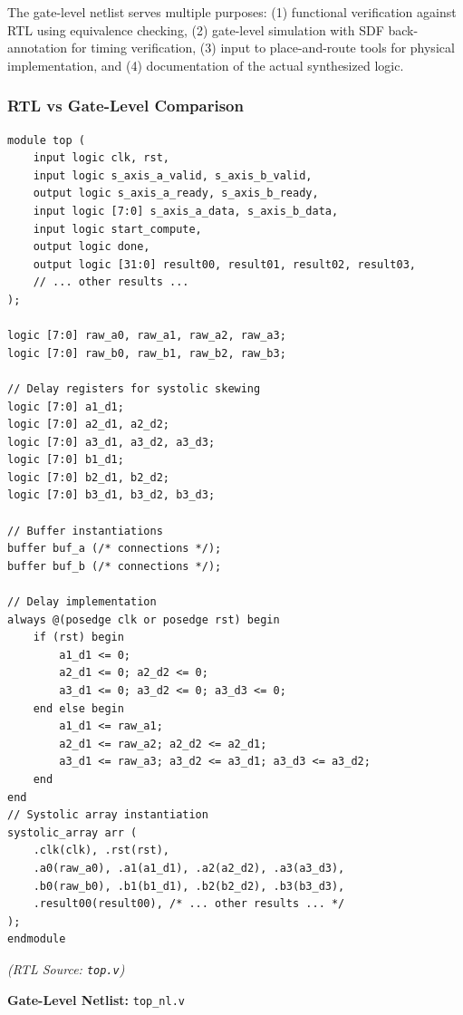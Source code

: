 \documentclass[12pt,a4paper]{article}
\begin{document}
The gate-level netlist serves multiple purposes: (1) functional verification against RTL using equivalence checking, (2) gate-level simulation with SDF back-annotation for timing verification, (3) input to place-and-route tools for physical implementation, and (4) documentation of the actual synthesized logic.

\subsubsection{RTL vs Gate-Level Comparison}



\begin{lstlisting}[style=verilog,caption={Top-Level Integration with Skewing Logic (Excerpt)},label={lst:top}]
module top (
    input logic clk, rst,
    input logic s_axis_a_valid, s_axis_b_valid,
    output logic s_axis_a_ready, s_axis_b_ready,
    input logic [7:0] s_axis_a_data, s_axis_b_data,
    input logic start_compute,
    output logic done,
    output logic [31:0] result00, result01, result02, result03,
    // ... other results ...
);

logic [7:0] raw_a0, raw_a1, raw_a2, raw_a3;
logic [7:0] raw_b0, raw_b1, raw_b2, raw_b3;

// Delay registers for systolic skewing
logic [7:0] a1_d1;
logic [7:0] a2_d1, a2_d2;
logic [7:0] a3_d1, a3_d2, a3_d3;
logic [7:0] b1_d1;
logic [7:0] b2_d1, b2_d2;
logic [7:0] b3_d1, b3_d2, b3_d3;

// Buffer instantiations
buffer buf_a (/* connections */);
buffer buf_b (/* connections */);

// Delay implementation
always @(posedge clk or posedge rst) begin
    if (rst) begin
        a1_d1 <= 0;
        a2_d1 <= 0; a2_d2 <= 0;
        a3_d1 <= 0; a3_d2 <= 0; a3_d3 <= 0;
    end else begin
        a1_d1 <= raw_a1;
        a2_d1 <= raw_a2; a2_d2 <= a2_d1;
        a3_d1 <= raw_a3; a3_d2 <= a3_d1; a3_d3 <= a3_d2;
    end
end
// Systolic array instantiation
systolic_array arr (
    .clk(clk), .rst(rst),
    .a0(raw_a0), .a1(a1_d1), .a2(a2_d2), .a3(a3_d3),
    .b0(raw_b0), .b1(b1_d1), .b2(b2_d2), .b3(b3_d3),
    .result00(result00), /* ... other results ... */
);
endmodule
\end{lstlisting}
\textit{(RTL Source: \texttt{top.v})}


\textbf{Gate-Level Netlist:} \texttt{top\_nl.v}

  
\end{document}
